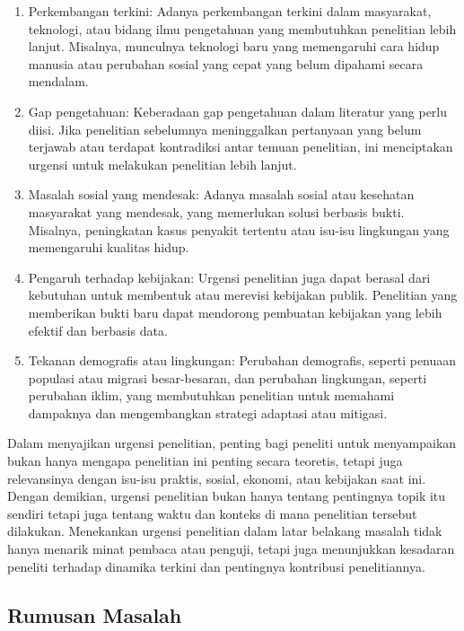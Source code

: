 \documentclass[
  indonesian,
  letterpaper,
]{scrbook}
\providecommand{\tightlist}{%
  \setlength{\itemsep}{0pt}\setlength{\parskip}{0pt}}
\begin{document}
\begin{enumerate}
\def\labelenumi{\arabic{enumi}.}
\tightlist
\item
  Perkembangan terkini: Adanya perkembangan terkini dalam masyarakat,
  teknologi, atau bidang ilmu pengetahuan yang membutuhkan penelitian
  lebih lanjut. Misalnya, munculnya teknologi baru yang memengaruhi cara
  hidup manusia atau perubahan sosial yang cepat yang belum dipahami
  secara mendalam.
\item
  Gap pengetahuan: Keberadaan gap pengetahuan dalam literatur yang perlu
  diisi. Jika penelitian sebelumnya meninggalkan pertanyaan yang belum
  terjawab atau terdapat kontradiksi antar temuan penelitian, ini
  menciptakan urgensi untuk melakukan penelitian lebih lanjut.
\item
  Masalah sosial yang mendesak: Adanya masalah sosial atau kesehatan
  masyarakat yang mendesak, yang memerlukan solusi berbasis bukti.
  Misalnya, peningkatan kasus penyakit tertentu atau isu-isu lingkungan
  yang memengaruhi kualitas hidup.
\item
  Pengaruh terhadap kebijakan: Urgensi penelitian juga dapat berasal
  dari kebutuhan untuk membentuk atau merevisi kebijakan publik.
  Penelitian yang memberikan bukti baru dapat mendorong pembuatan
  kebijakan yang lebih efektif dan berbasis data.
\item
  Tekanan demografis atau lingkungan: Perubahan demografis, seperti
  penuaan populasi atau migrasi besar-besaran, dan perubahan lingkungan,
  seperti perubahan iklim, yang membutuhkan penelitian untuk memahami
  dampaknya dan mengembangkan strategi adaptasi atau mitigasi.
\end{enumerate}

Dalam menyajikan urgensi penelitian, penting bagi peneliti untuk
menyampaikan bukan hanya mengapa penelitian ini penting secara teoretis,
tetapi juga relevansinya dengan isu-isu praktis, sosial, ekonomi, atau
kebijakan saat ini. Dengan demikian, urgensi penelitian bukan hanya
tentang pentingnya topik itu sendiri tetapi juga tentang waktu dan
konteks di mana penelitian tersebut dilakukan. Menekankan urgensi
penelitian dalam latar belakang masalah tidak hanya menarik minat
pembaca atau penguji, tetapi juga menunjukkan kesadaran peneliti
terhadap dinamika terkini dan pentingnya kontribusi penelitiannya.

\subsection{Rumusan Masalah}\label{rumusan-masalah}
\end{document}
